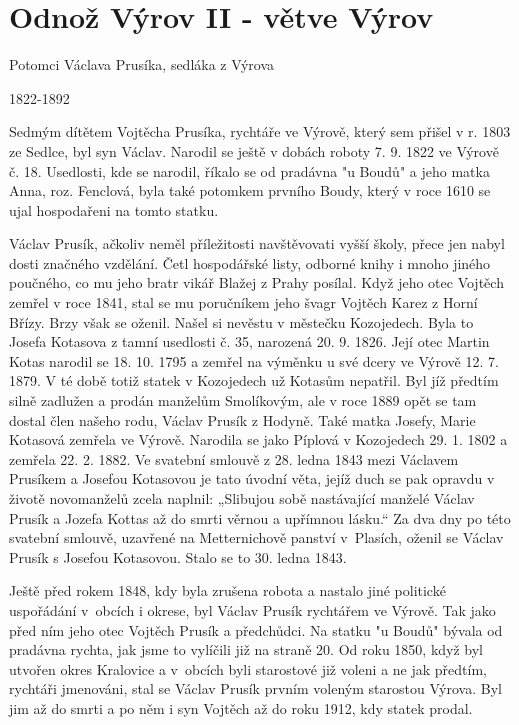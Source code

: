 \documentclass[../dejiny-rodu-prusiku.tex]{subfiles}
\begin{document}
\section{Odnož Výrov II - větve Výrov}

Potomci Václava Prusíka, sedláka z Výrova

1822-1892

Sedmým dítětem Vojtěcha Prusíka, rychtáře ve Výrově, který sem přišel v r. 1803 ze Sedlce, byl syn Václav. Narodil se ještě v dobách roboty 7. 9. 1822  ve Výrově č. 18. Usedlosti, kde se narodil, říkalo se od pradávna "u Boudů" a jeho matka Anna, roz. Fenclová, byla také potomkem prvního Boudy, který v roce 1610 se ujal hospodařeni na tomto statku.

Václav Prusík, ačkoliv neměl příležitosti navštěvovati vyšší školy, přece jen nabyl dosti značného vzdělání. Četl hospodářské listy, odborné knihy i mnoho jiného poučného, co mu jeho bratr vikář Blažej z Prahy posílal. Když jeho otec Vojtěch zemřel v roce 1841, stal se mu poručníkem jeho švagr Vojtěch Karez z Horní Břízy. Brzy však se oženil. Našel si nevěstu v městečku Kozojedech. Byla to Josefa Kotasova z tamní usedlosti č. 35, narozená 20. 9. 1826. Její otec Martin Kotas narodil se 18. 10. 1795 a zemřel na výměnku u své dcery ve Výrově 12. 7. 1879. V té době totiž statek v Kozojedech už Kotasům nepatřil. Byl jíž předtím silně zadlužen a prodán manželům Smolíkovým, ale v roce 1889 opět se tam dostal člen našeho rodu, Václav Prusík z Hodyně. Také matka Josefy, Marie Kotasová zemřela ve Výrově. Narodila se jako Píplová v Kozojedech 29. 1. 1802 a zemřela 22. 2. 1882. Ve svatební smlouvě z 28. ledna 1843 mezi Václavem Prusíkem a Josefou Kotasovou je tato úvodní věta, jejíž duch se pak opravdu v životě novomanželů zcela naplnil: „Slibujou sobě nastávající manželé Václav Prusík a Jozefa Kottas až do smrti věrnou a upřímnou lásku.“ Za dva dny po této svatební smlouvě, uzavřené na Metternichově panství v Plasích, oženil se Václav Prusík s Josefou Kotasovou. Stalo se to 30. ledna 1843.

Ještě před rokem 1848, kdy byla zrušena robota a nastalo jiné politické uspořádání v obcích i okrese, byl Václav Prusík rychtářem ve Výrově. Tak jako před ním jeho otec Vojtěch Prusík a předchůdci. Na statku "u Boudů" bývala od pradávna rychta, jak jsme to vylíčili již na straně 20. Od roku 1850, když byl utvořen okres Kralovice a v obcích byli starostové již voleni a ne jak předtím, rychtáři jmenováni, stal se Václav Prusík prvním voleným starostou Výrova. Byl jim až do smrti a po něm i syn Vojtěch až do roku 1912, kdy statek prodal.
\end{document}
